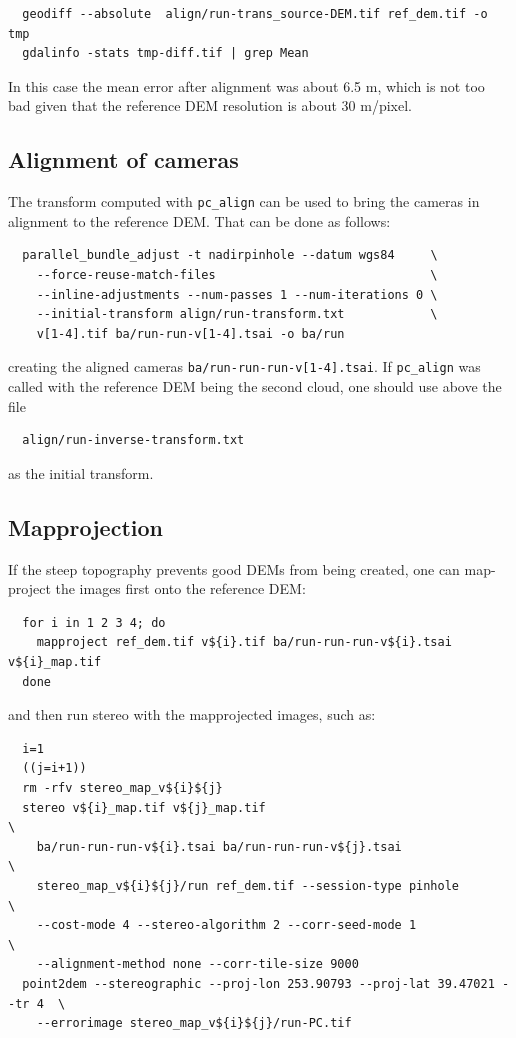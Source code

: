\begin{verbatim}
  geodiff --absolute  align/run-trans_source-DEM.tif ref_dem.tif -o tmp 
  gdalinfo -stats tmp-diff.tif | grep Mean
\end{verbatim}

In this case the mean error after alignment was about 6.5 m, 
which is not too bad given that the reference DEM resolution is about
30 m/pixel.

\subsection{Alignment of cameras}

The transform computed with \texttt{pc\_align} can be used
to bring the cameras in alignment to the reference DEM. That can 
be done as follows:

\begin{verbatim}
  parallel_bundle_adjust -t nadirpinhole --datum wgs84     \
    --force-reuse-match-files                              \
    --inline-adjustments --num-passes 1 --num-iterations 0 \
    --initial-transform align/run-transform.txt            \
    v[1-4].tif ba/run-run-v[1-4].tsai -o ba/run
\end{verbatim}

creating the aligned cameras \texttt{ba/run-run-run-v[1-4].tsai}. 
If \texttt{pc\_align} was called with the reference DEM being
the second cloud, one should use above the file
\begin{verbatim}
  align/run-inverse-transform.txt
\end{verbatim}
as the initial transform.

\subsection{Mapprojection}

If the steep topography prevents good DEMs from being created, one can 
map-project the images first onto the reference DEM:

\begin{verbatim}
  for i in 1 2 3 4; do 
    mapproject ref_dem.tif v${i}.tif ba/run-run-run-v${i}.tsai v${i}_map.tif  
  done
\end{verbatim} %

and then run stereo with the mapprojected images, such as:

\begin{verbatim}
  i=1
  ((j=i+1))
  rm -rfv stereo_map_v${i}${j}
  stereo v${i}_map.tif v${j}_map.tif                                         \
    ba/run-run-run-v${i}.tsai ba/run-run-run-v${j}.tsai                      \
    stereo_map_v${i}${j}/run ref_dem.tif --session-type pinhole              \
    --cost-mode 4 --stereo-algorithm 2 --corr-seed-mode 1                    \
    --alignment-method none --corr-tile-size 9000                            
  point2dem --stereographic --proj-lon 253.90793 --proj-lat 39.47021 --tr 4  \
    --errorimage stereo_map_v${i}${j}/run-PC.tif
\end{verbatim}

